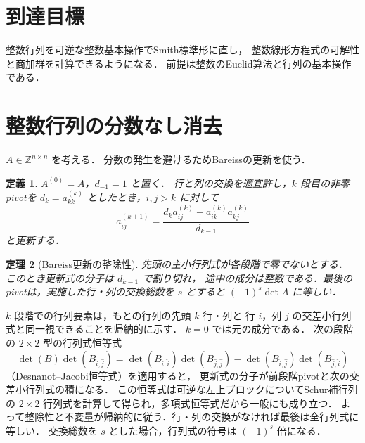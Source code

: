 \documentclass[a5paper,10pt,onecolumn]{jsarticle}
\makeatletter
\theoremstyle{mathnotetheorem}
\newtheorem{theorem}{定理}[section]
\newtheorem{definition}[theorem]{定義}
\renewcommand{\proofname}{証明}
\renewenvironment{proof}[1][\proofname]{%
  \par\pushQED{\qed}\normalfont\topsep4\p@\@plus2\p@\relax
  \trivlist\item[\hskip\labelsep\bfseries #1]\ignorespaces
}{\popQED\endtrivlist\@endpefalse}
\makeatother
\begin{document}
\section*{到達目標}
整数行列を可逆な整数基本操作でSmith標準形に直し，
整数線形方程式の可解性と商加群を計算できるようになる．
前提は整数のEuclid算法と行列の基本操作である．

\section{整数行列の分数なし消去}
$A\in\mathbb Z^{n\times n}$ を考える．
分数の発生を避けるためBareissの更新を使う．
\begin{definition}
$A^{(0)}=A$，$d_{-1}=1$ と置く．
行と列の交換を適宜許し，$k$ 段目の非零pivotを
$d_k=a^{(k)}_{kk}$ としたとき，$i,j>k$ に対して
\[
 a^{(k+1)}_{ij}=
 \frac{d_k a^{(k)}_{ij}-a^{(k)}_{ik}a^{(k)}_{kj}}{d_{k-1}}
\]
と更新する．
\end{definition}
\begin{theorem}[Bareiss更新の整除性]
先頭の主小行列式が各段階で零でないとする．
このとき更新式の分子は $d_{k-1}$ で割り切れ，
途中の成分は整数である．最後のpivotは，実施した行・列の交換総数を $s$ とすると $(-1)^s\det A$ に等しい．
\end{theorem}
\begin{proof}
$k$ 段階での行列要素は，もとの行列の先頭 $k$ 行・列と
行 $i$，列 $j$ の交差小行列式と同一視できることを帰納的に示す．
$k=0$ では元の成分である．
次の段階の $2\times2$ 型の行列式恒等式
\[
 \det(B)\det(B_{\widehat{i},\widehat{j}})
 =\det(B_{\widehat i,\widehat i})
  \det(B_{\widehat j,\widehat j})
 -\det(B_{\widehat i,\widehat j})
  \det(B_{\widehat j,\widehat i})
\]
（Desnanot--Jacobi恒等式）を適用すると，
更新式の分子が前段階pivotと次の交差小行列式の積になる．
この恒等式は可逆な左上ブロックについてSchur補行列の
$2\times2$ 行列式を計算して得られ，多項式恒等式だから一般にも成り立つ．
よって整除性と不変量が帰納的に従う．行・列の交換がなければ最後は全行列式に等しい．
交換総数を $s$ とした場合，行列式の符号は $(-1)^s$ 倍になる．
\end{proof}
\end{document}
